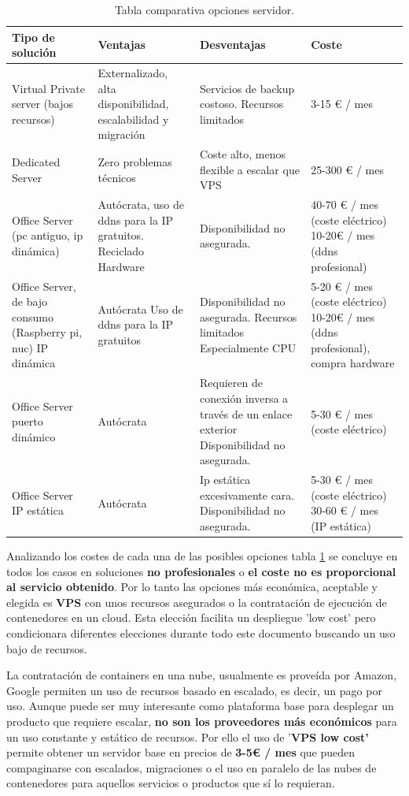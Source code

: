 \begin{table}[!ht]
    \centering
    \label{T:tipos_servidores}
    \caption{Tabla comparativa opciones servidor.}    
    \begin{tabular}{|p{3cm}|p{3.5cm}|p{3.5cm}|p{3cm}|}
    \hline \hline
        \textbf{Tipo de solución} & \textbf{Ventajas} & \textbf{Desventajas} & \textbf{Coste} \\ \hline
        Virtual Private server (bajos recursos) & Externalizado, alta disponibilidad, escalabilidad y migración & Servicios de backup costoso. Recursos limitados & 3-15 € / mes \\ \hline
        Dedicated Server & Zero problemas técnicos & Coste alto, menos flexible a escalar que VPS & 25-300 € / mes \\ \hline
        Office Server (pc antiguo, ip dinámica) & Autócrata, uso de ddns para la IP gratuitos. Reciclado Hardware & Disponibilidad no asegurada. & 40-70 € / mes (coste eléctrico) 10-20€ / mes (ddns profesional) \\ \hline
        Office Server, de bajo consumo (Raspberry pi, nuc) IP dinámica & Autócrata Uso de ddns para la IP gratuitos & Disponibilidad no asegurada. Recursos limitados Especialmente CPU & 5-20 € / mes (coste eléctrico) 10-20€ / mes (ddns profesional), compra hardware \\ \hline
        Office Server puerto dinámico & Autócrata & Requieren de conexión inversa a través de un enlace exterior Disponibilidad no asegurada. & 5-30 € / mes (coste eléctrico) \\ \hline
        Office Server IP estática & Autócrata & Ip estática excesivamente cara. Disponibilidad no asegurada. & 5-30 € / mes (coste eléctrico) 30-60 € / mes (IP estática) \\ \hline
    \end{tabular}
\end{table}

Analizando los costes de cada una de las posibles opciones tabla \ref{T:tipos_servidores} se concluye en todos los casos en soluciones \textbf{no profesionales} o \textbf{el coste no es proporcional al servicio obtenido}. Por lo tanto las opciones más económica, aceptable y elegida es \textbf{VPS} con unos recursos asegurados o la contratación de ejecución de contenedores en un cloud. Esta elección facilita un despliegue 'low cost' pero condicionara diferentes elecciones durante todo este documento buscando un uso bajo de recursos.

La contratación de containers en una nube, usualmente es proveída por Amazon, Google permiten un uso de recursos basado en escalado, es decir, un pago por uso. Aunque puede ser muy interesante como plataforma base para desplegar un producto que requiere escalar, \textbf{no son los proveedores más económicos} para un uso constante y estático de recursos. Por ello el uso de '\textbf{VPS low cost'} permite obtener un servidor base en precios de \textbf{3-5€ / mes} que pueden compaginarse con escalados, migraciones o el uso en paralelo de las nubes de contenedores para aquellos servicios o productos que sí lo requieran.

